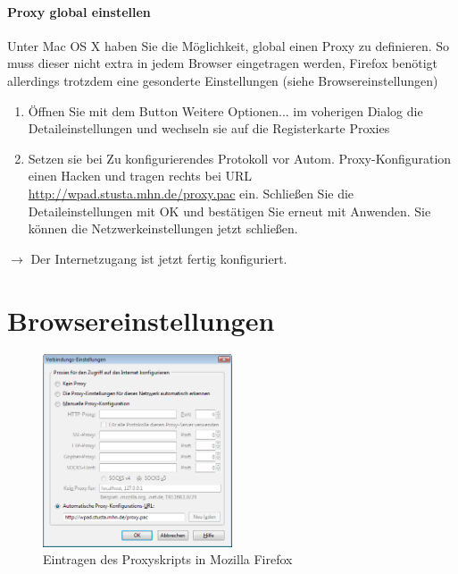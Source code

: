 \documentclass[a4paper,12pt]{scrartcl}
\begin{document}
\paragraph*{Proxy global einstellen}
Unter Mac OS X haben Sie die Möglichkeit, global einen Proxy zu definieren. So muss dieser nicht extra in jedem Browser eingetragen werden, Firefox benötigt allerdings trotzdem eine gesonderte Einstellungen (siehe Browsereinstellungen)
\begin{enumerate}
    \item Öffnen Sie mit dem Button Weitere Optionen... im voherigen Dialog die Detaileinstellungen und wechseln sie auf die Registerkarte Proxies
    \item Setzen sie bei Zu konfigurierendes Protokoll vor Autom. Proxy-Konfiguration einen Hacken und tragen rechts bei URL \url{http://wpad.stusta.mhn.de/proxy.pac} ein. Schließen Sie die Detaileinstellungen mit OK und bestätigen Sie erneut mit Anwenden. Sie können die Netzwerkeinstellungen jetzt schließen.
\end{enumerate}
$\rightarrow$ Der Internetzugang ist jetzt fertig konfiguriert.

\newpage

\section*{Browsereinstellungen}

\begin{figure}
  \begin{center}
    \includegraphics[width=0.5\textwidth,keepaspectratio]{Bilder/Proxy_Firefox}
  \end{center}
  \caption{Eintragen des Proxyskripts in Mozilla Firefox}
\end{figure}
\end{document}
